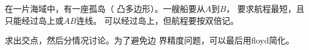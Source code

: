 \begin{prob}
	在一片海域中，有一座孤岛（
	凸多边形）。一艘船要从$A$到$B$，
	要求航程最短，且只能经过岛上或$AB$连线。
	可以经过岛上，但航程要按双倍记。
\end{prob}

\begin{sol}
	求出交点，然后分情况讨论。为了避免边
	界精度问题，可以最后用floyd简化。
\end{sol}
